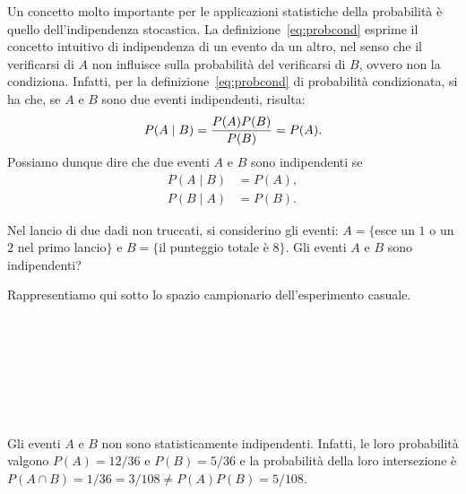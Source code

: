 Un concetto molto importante per le applicazioni statistiche della probabilità è quello dell'indipendenza stocastica. La definizione~\eqref{eq:probcond} esprime il concetto intuitivo di indipendenza di un evento da un altro, nel senso che il verificarsi di $A$ non influisce sulla probabilità del verificarsi di $B$, ovvero non la condiziona. Infatti, per la definizione~\eqref{eq:probcond} di probabilità condizionata, si ha che, se $A$ e $B$ sono due eventi indipendenti, risulta:   
\begin{equation}
P(A \mid B) = \frac{P(A)P(B)}{P(B)} = P(A).\notag
\end{equation}
Possiamo dunque dire che due eventi $A$ e $B$ sono indipendenti se
\begin{equation}
\begin{split}
P(A \mid B) &= P(A), \\
P(B \mid A) &= P(B).
\end{split}
\end{equation}

\begin{exmp}
Nel lancio di due dadi non truccati, si considerino gli eventi: $A=\{$esce un $1$ o un $2$ nel primo lancio$\}$ e $B=\{$il punteggio totale è $8\}$. 
Gli eventi $A$ e $B$ sono indipendenti?
\end{exmp}

\begin{solu}
Rappresentiamo qui sotto lo spazio campionario dell'esperimento casuale.
\begin{center}
{\large
\noindent
{}\, \, \, 
\, \, \\
\, \, \, 
\, \, \\
\, \, \, 
\, \, \\
\, \, \, 
\, \, \\
\, \, \, 
\, \, \\
\, \, \, 
\, \, \\
}
\end{center}
Gli eventi $A$ e $B$ non sono statisticamente indipendenti. 
Infatti, le loro probabilità valgono $P(A) = 12/36$ e $P(B) = 5/36$ e la probabilità della loro intersezione è 
$P(A \cap B) = 1/36 = 3/108 \neq P(A)P(B) = 5/108$.
\end{solu}

